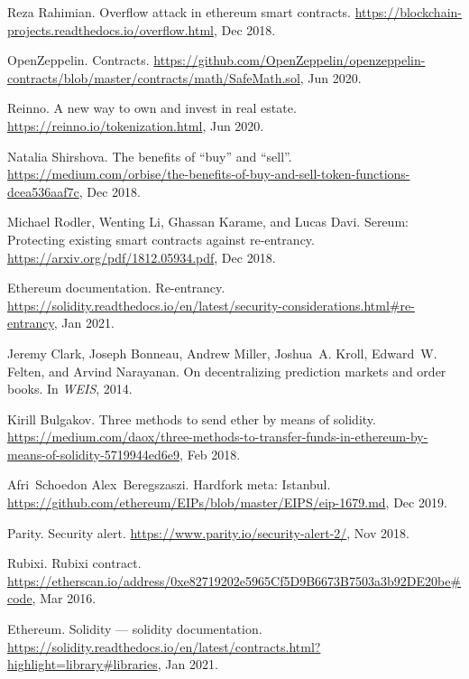\begin{thebibliography}{10}
Reza Rahimian.
\newblock Overflow attack in ethereum smart contracts.
\newblock \url{https://blockchain-projects.readthedocs.io/overflow.html}, Dec
  2018.

OpenZeppelin.
\newblock Contracts.
\newblock
  \url{https://github.com/OpenZeppelin/openzeppelin-contracts/blob/master/contracts/math/SafeMath.sol},
  Jun 2020.

Reinno.
\newblock A new way to own and invest in real estate.
\newblock \url{https://reinno.io/tokenization.html}, Jun 2020.

Natalia Shirshova.
\newblock The benefits of ``buy'' and ``sell''.
\newblock
  \url{https://medium.com/orbise/the-benefits-of-buy-and-sell-token-functions-dcea536aaf7c},
  Dec 2018.

Michael Rodler, Wenting Li, Ghassan Karame, and Lucas Davi.
\newblock Sereum: Protecting existing smart contracts against re-entrancy.
\newblock \url{https://arxiv.org/pdf/1812.05934.pdf}, Dec 2018.

Ethereum documentation.
\newblock Re-entrancy.
\newblock
  \url{https://solidity.readthedocs.io/en/latest/security-considerations.html\#re-entrancy},
  Jan 2021.

Jeremy Clark, Joseph Bonneau, Andrew Miller, Joshua~A. Kroll, Edward~W. Felten,
  and Arvind Narayanan.
\newblock On decentralizing prediction markets and order books.
\newblock In {\em WEIS}, 2014.

Kirill Bulgakov.
\newblock Three methods to send ether by means of solidity.
\newblock
  \url{https://medium.com/daox/three-methods-to-transfer-funds-in-ethereum-by-means-of-solidity-5719944ed6e9},
  Feb 2018.

Afri~Schoedon Alex~Beregszaszi.
\newblock Hardfork meta: Istanbul.
\newblock \url{https://github.com/ethereum/EIPs/blob/master/EIPS/eip-1679.md},
  Dec 2019.

Parity.
\newblock Security alert.
\newblock \url{https://www.parity.io/security-alert-2/}, Nov 2018.

Rubixi.
\newblock Rubixi contract.
\newblock
  \url{https://etherscan.io/address/0xe82719202e5965Cf5D9B6673B7503a3b92DE20be#code},
  Mar 2016.

Ethereum.
\newblock Solidity --- solidity documentation.
\newblock
  \url{https://solidity.readthedocs.io/en/latest/contracts.html?highlight=library\#libraries},
  Jan 2021.


\end{thebibliography}
